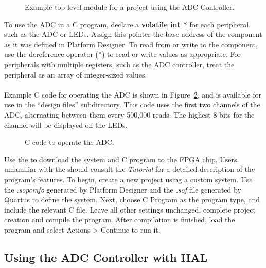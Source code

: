 \documentclass[11pt, twoside, pdftex]{article}
\begin{document}
\begin{figure}[H]

\caption{Example top-level module for a project using the ADC Controller.}
\label{fig:top_level}
\end{figure}

To use the ADC in a C program, declare a {\bf volatile int *} for each peripheral, such as the ADC or LEDs. Assign this pointer the base address of the component as it was defined in Platform Designer. To read from or write to the component, use the dereference operator (*) to read or write values as appropriate. For peripherals with multiple registers, such as the ADC controller, treat the peripheral as an array of integer-sized values.\\
\\
Example C code for operating the ADC is shown in Figure~\ref{fig:c_code}, and is available for use in the ``design files'' subdirectory. This code uses the first two channels of the ADC, alternating between them every \mbox{500,000} reads. The highest 8 bits for the channel will be displayed on the LEDs.\\
\begin{figure}

\caption{C code to operate the ADC.}
\label{fig:c_code}
\end{figure}

Use the \productNameMed{} to download the system and C program to the FPGA chip. Users unfamiliar with the \productNameMed{} should consult the {\it \productNameMed{} Tutorial} for a detailed description of the program's features. To begin, create a new project using a custom system. Use the {\it .sopcinfo} generated by Platform Designer and the {\it .sof} file generated by Quartus to define the system. Next, choose {\sf C Program} as the program type, and include the relevant C file. Leave all other settings unchanged, complete project creation and compile the program. After compilation is finished, load the program and select {\sf Actions > Continue} to run it.

\clearpage
\newpage
\subsection{Using the ADC Controller with HAL}
\end{document}
